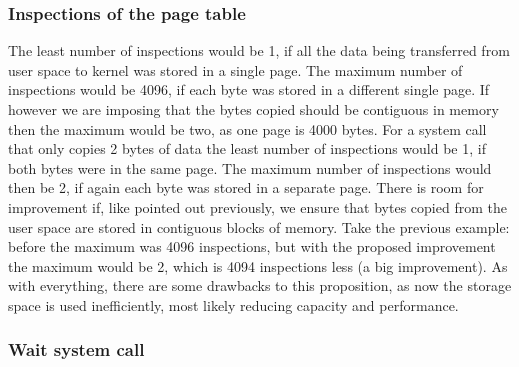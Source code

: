 \documentclass{article}
\renewcommand{\_}{\char`_}
\begin{document}
\subsubsection{Inspections of the page table}
The least number of inspections would be 1, if all the data being transferred from user space to kernel was stored in a single page. The maximum number of inspections would be 4096, if each byte was stored in a different single page. If however we are imposing that the bytes copied should be contiguous in memory then the maximum would be two, as one page is 4000 bytes. For a system call that only copies 2 bytes of data the least number of inspections would be 1, if both bytes were in the same page. The maximum number of inspections would then be 2, if again each byte was stored in a separate page. There is room for improvement if, like pointed out previously, we ensure that bytes copied from the user space are stored in contiguous blocks of memory. Take the previous example: before the maximum was 4096 inspections, but with the proposed improvement the maximum would be 2, which is 4094 inspections less (a big improvement). As with everything, there are some drawbacks to this proposition, as now the storage space is used inefficiently, most likely reducing capacity and performance.

\subsubsection{Wait system call}
\end{document}
